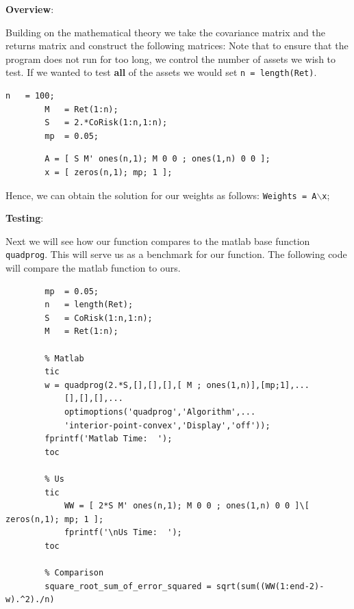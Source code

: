 \documentclass[12pt,titlepage,letter]{article}
\begin{document}
	\begin{par}
		\textbf{Overview}:
	\end{par} \vspace{1em}
	\begin{par}
		Building on the mathematical theory we take the covariance matrix and the returns matrix and construct the following matrices: Note that to ensure that the program does not run for too long, we control the number of assets we wish to test. If we wanted to test \textbf{all} of the assets we would set \texttt{n = length(Ret)}.
	\end{par} \vspace{1em}
	\begin{verbatim}n   = 100;
		M   = Ret(1:n);
		S   = 2.*CoRisk(1:n,1:n);
		mp  = 0.05;
	\end{verbatim}
	\begin{verbatim}
		A = [ S M' ones(n,1); M 0 0 ; ones(1,n) 0 0 ];
		x = [ zeros(n,1); mp; 1 ];
	\end{verbatim}
	\begin{par}
		Hence, we can obtain the solution for our weights as follows: \texttt{Weights = A\ensuremath{\backslash}x};
	\end{par} \vspace{1em}
	\begin{par}
		\textbf{Testing}:
	\end{par} \vspace{1em}
	\begin{par}
		Next we will see how our function compares to the matlab base function \texttt{quadprog}. This will serve us as a benchmark for our function. The following code will compare the matlab function to ours.
	\end{par} \vspace{1em}
	\begin{verbatim}
		mp  = 0.05;
		n   = length(Ret);
		S   = CoRisk(1:n,1:n);
		M   = Ret(1:n);

		% Matlab
		tic
	    w = quadprog(2.*S,[],[],[],[ M ; ones(1,n)],[mp;1],...
            [],[],[],...
            optimoptions('quadprog','Algorithm',...
            'interior-point-convex','Display','off'));
	    fprintf('Matlab Time:  ');
		toc

		% Us
		tic
		    WW = [ 2*S M' ones(n,1); M 0 0 ; ones(1,n) 0 0 ]\[ zeros(n,1); mp; 1 ];
		    fprintf('\nUs Time:  ');
		toc

		% Comparison
		square_root_sum_of_error_squared = sqrt(sum((WW(1:end-2)-w).^2)./n)
	\end{verbatim}
\end{document}
